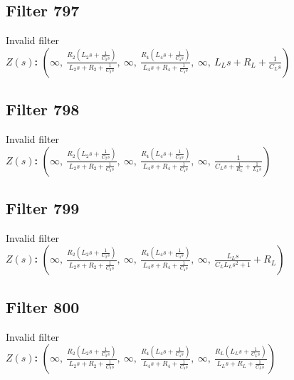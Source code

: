 \documentclass{article}
\begin{document}
\subsection*{Filter 797}
Invalid filter \\ 
\textbf{$Z(s)$:} $\left( \infty, \  \frac{R_{2} \left(L_{2} s + \frac{1}{C_{2} s}\right)}{L_{2} s + R_{2} + \frac{1}{C_{2} s}}, \  \infty, \  \frac{R_{4} \left(L_{4} s + \frac{1}{C_{4} s}\right)}{L_{4} s + R_{4} + \frac{1}{C_{4} s}}, \  \infty, \  L_{L} s + R_{L} + \frac{1}{C_{L} s}\right)$ \\ 
\subsection*{Filter 798}
Invalid filter \\ 
\textbf{$Z(s)$:} $\left( \infty, \  \frac{R_{2} \left(L_{2} s + \frac{1}{C_{2} s}\right)}{L_{2} s + R_{2} + \frac{1}{C_{2} s}}, \  \infty, \  \frac{R_{4} \left(L_{4} s + \frac{1}{C_{4} s}\right)}{L_{4} s + R_{4} + \frac{1}{C_{4} s}}, \  \infty, \  \frac{1}{C_{L} s + \frac{1}{R_{L}} + \frac{1}{L_{L} s}}\right)$ \\ 
\subsection*{Filter 799}
Invalid filter \\ 
\textbf{$Z(s)$:} $\left( \infty, \  \frac{R_{2} \left(L_{2} s + \frac{1}{C_{2} s}\right)}{L_{2} s + R_{2} + \frac{1}{C_{2} s}}, \  \infty, \  \frac{R_{4} \left(L_{4} s + \frac{1}{C_{4} s}\right)}{L_{4} s + R_{4} + \frac{1}{C_{4} s}}, \  \infty, \  \frac{L_{L} s}{C_{L} L_{L} s^{2} + 1} + R_{L}\right)$ \\ 
\subsection*{Filter 800}
Invalid filter \\ 
\textbf{$Z(s)$:} $\left( \infty, \  \frac{R_{2} \left(L_{2} s + \frac{1}{C_{2} s}\right)}{L_{2} s + R_{2} + \frac{1}{C_{2} s}}, \  \infty, \  \frac{R_{4} \left(L_{4} s + \frac{1}{C_{4} s}\right)}{L_{4} s + R_{4} + \frac{1}{C_{4} s}}, \  \infty, \  \frac{R_{L} \left(L_{L} s + \frac{1}{C_{L} s}\right)}{L_{L} s + R_{L} + \frac{1}{C_{L} s}}\right)$ \\ 
\end{document}
